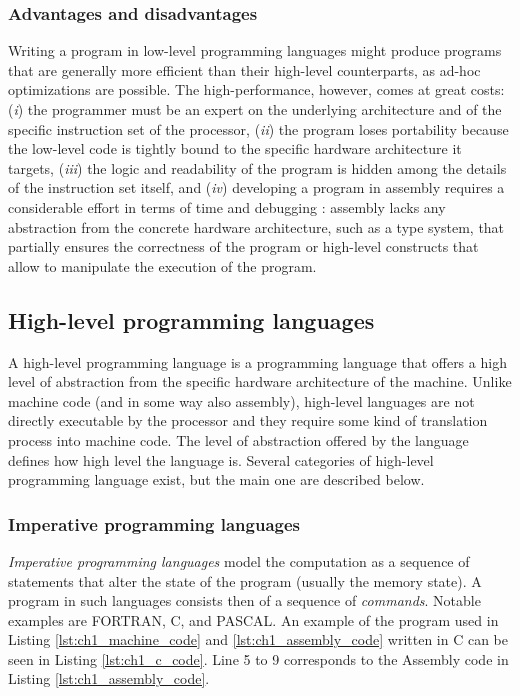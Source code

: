 \subsubsection*{Advantages and disadvantages}
Writing a program in low-level programming languages might produce programs that are generally more efficient than their high-level counterparts, as ad-hoc optimizations are possible. The high-performance, however, comes at great costs: (\textit{i}) the programmer must be an expert on the underlying architecture and of the specific instruction set of the processor, (\textit{ii}) the program loses portability because the low-level code is tightly bound to the specific hardware architecture it targets, (\textit{iii}) the logic and readability of the program is hidden among the details of the instruction set itself, and (\textit{iv}) developing a program in assembly requires a considerable effort in terms of time and debugging \cite{frampton2009demystifying}: assembly lacks any abstraction from the concrete hardware architecture, such as a type system, that partially ensures the correctness of the program or high-level constructs that allow to manipulate the execution of the program.

\subsection{High-level programming languages}
\label{subsec:ch1_hl_languages}
A high-level programming language is a programming language that offers a high level of abstraction from the specific hardware architecture of the machine. Unlike machine code (and in some way also assembly), high-level languages are not directly executable by the processor and they require some kind of translation process into machine code. The level of abstraction offered by the language defines how high level the language is. Several categories of high-level programming language exist, but the main one are described below.

\subsubsection*{Imperative programming languages}
\textit{Imperative programming languages} model the computation as a sequence of statements that alter the state of the program (usually the memory state). A program in such languages consists then of a sequence of \textit{commands}. Notable examples are FORTRAN, C, and PASCAL. An example of the program used in Listing \ref{lst:ch1_machine_code} and \ref{lst:ch1_assembly_code} written in C can be seen in Listing \ref{lst:ch1_c_code}. Line 5 to 9 corresponds to the Assembly code in Listing \ref{lst:ch1_assembly_code}.

